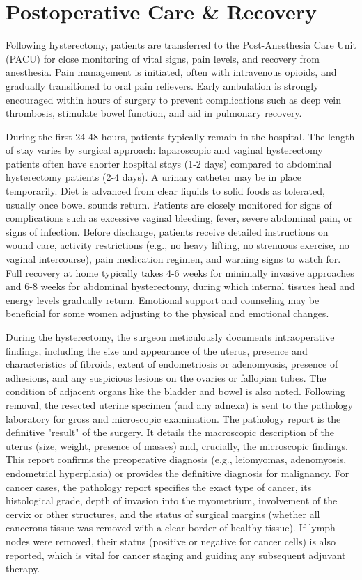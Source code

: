 \section*{Postoperative Care \& Recovery}
Following hysterectomy, patients are transferred to the Post-Anesthesia Care Unit (PACU) for close monitoring of vital signs, pain levels, and recovery from anesthesia. Pain management is initiated, often with intravenous opioids, and gradually transitioned to oral pain relievers. Early ambulation is strongly encouraged within hours of surgery to prevent complications such as deep vein thrombosis, stimulate bowel function, and aid in pulmonary recovery.

During the first 24-48 hours, patients typically remain in the hospital. The length of stay varies by surgical approach: laparoscopic and vaginal hysterectomy patients often have shorter hospital stays (1-2 days) compared to abdominal hysterectomy patients (2-4 days). A urinary catheter may be in place temporarily. Diet is advanced from clear liquids to solid foods as tolerated, usually once bowel sounds return. Patients are closely monitored for signs of complications such as excessive vaginal bleeding, fever, severe abdominal pain, or signs of infection. Before discharge, patients receive detailed instructions on wound care, activity restrictions (e.g., no heavy lifting, no strenuous exercise, no vaginal intercourse), pain medication regimen, and warning signs to watch for. Full recovery at home typically takes 4-6 weeks for minimally invasive approaches and 6-8 weeks for abdominal hysterectomy, during which internal tissues heal and energy levels gradually return. Emotional support and counseling may be beneficial for some women adjusting to the physical and emotional changes.

During the hysterectomy, the surgeon meticulously documents intraoperative findings, including the size and appearance of the uterus, presence and characteristics of fibroids, extent of endometriosis or adenomyosis, presence of adhesions, and any suspicious lesions on the ovaries or fallopian tubes. The condition of adjacent organs like the bladder and bowel is also noted. Following removal, the resected uterine specimen (and any adnexa) is sent to the pathology laboratory for gross and microscopic examination. The pathology report is the definitive "result" of the surgery. It details the macroscopic description of the uterus (size, weight, presence of masses) and, crucially, the microscopic findings. This report confirms the preoperative diagnosis (e.g., leiomyomas, adenomyosis, endometrial hyperplasia) or provides the definitive diagnosis for malignancy. For cancer cases, the pathology report specifies the exact type of cancer, its histological grade, depth of invasion into the myometrium, involvement of the cervix or other structures, and the status of surgical margins (whether all cancerous tissue was removed with a clear border of healthy tissue). If lymph nodes were removed, their status (positive or negative for cancer cells) is also reported, which is vital for cancer staging and guiding any subsequent adjuvant therapy.

